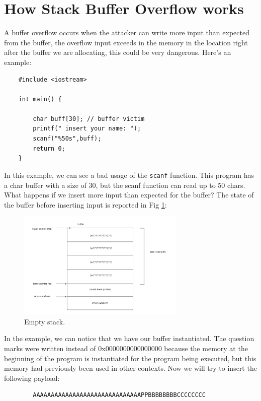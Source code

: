     \section{How Stack Buffer Overflow works}
    A buffer overflow occurs when the attacker can write more input than expected from the buffer, the overflow input exceeds in the memory in the location right after the buffer we are allocating, this could be very dangerous.\newline
    Here's an example:
    \begin{verbatim}
    #include <iostream>
    
    int main() {
    
        char buff[30]; // buffer victim 
        printf(" insert your name: ");
        scanf("%50s",buff); 
        return 0;
    }
    \end{verbatim}
    In this example, we can see a bad usage of the \texttt{scanf} function.\newline
    This program has a char buffer with a size of 30, but the scanf function can read up to 50 chars.\newline 
    What happens if we insert more input than expected for the buffer?\newline
    The state of the buffer before inserting input is reported in Fig \ref{fig:example_empty_buffer}:\newline
    \begin{figure}[h]
    \centering
    \includegraphics[width=8cm]{Images/chunk_wout_cacnary.png}
    \caption{Empty stack.}
    \label{fig:example_empty_buffer}
    \end{figure}
       \clearpage
    In the example, we can notice that we have our buffer instantiated.\newline
    The question marks were written instead of 0x0000000000000000 because the memory at the beginning of the program is instantiated for the program being executed, but this memory had previously been used in other contexts.\newline
    Now we will try to insert the following payload:
    \begin{verbatim}
        AAAAAAAAAAAAAAAAAAAAAAAAAAAAAAPPBBBBBBBBCCCCCCCC
    \end{verbatim}
   
